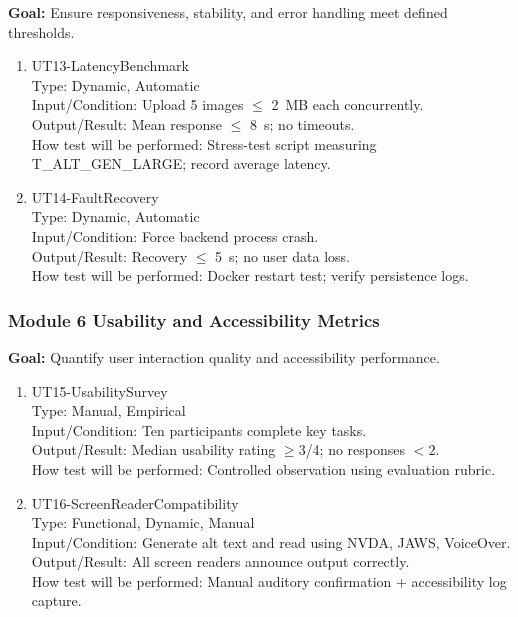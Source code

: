 \documentclass[12pt, titlepage]{article}
\begin{document}
\textbf{Goal:} Ensure responsiveness, stability, and error handling meet defined thresholds.

\begin{enumerate}
\item{UT13-LatencyBenchmark\\}
Type: Dynamic, Automatic\\
Input/Condition: Upload 5 images $\leq$ 2~MB each concurrently.\\
Output/Result: Mean response $\leq$ 8~s; no timeouts.\\
How test will be performed: Stress-test script measuring T\_ALT\_GEN\_LARGE; record average latency.

\item{UT14-FaultRecovery\\}
Type: Dynamic, Automatic\\
Input/Condition: Force backend process crash.\\
Output/Result: Recovery $\leq$ 5~s; no user data loss.\\
How test will be performed: Docker restart test; verify persistence logs.
\end{enumerate}

\subsubsection{Module 6 \textemdash{} Usability and Accessibility Metrics}

\textbf{Goal:} Quantify user interaction quality and accessibility performance.

\begin{enumerate}
\item{UT15-UsabilitySurvey\\}
Type: Manual, Empirical\\
Input/Condition: Ten participants complete key tasks.\\
Output/Result: Median usability rating $\geq 3$/4; no responses $<2$.\\
How test will be performed: Controlled observation using evaluation rubric.

\item{UT16-ScreenReaderCompatibility\\}
Type: Functional, Dynamic, Manual\\
Input/Condition: Generate alt text and read using NVDA, JAWS, VoiceOver.\\
Output/Result: All screen readers announce output correctly.\\
How test will be performed: Manual auditory confirmation + accessibility log capture.
\end{enumerate}
\end{document}
